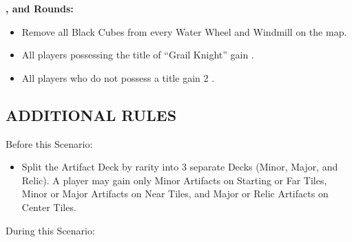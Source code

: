 \begin{multicols*}{2}
\textbf{,  and  Rounds:}
\begin{itemize}
  \item Remove all Black Cubes from every Water Wheel and Windmill on the map.
  \item All players possessing the title of ``\textcolor{cobalt}{Grail Knight}'' gain .
  \item All players who do not possess a title gain 2 .
\end{itemize}

\subsection*{\MakeUppercase{Additional Rules}}
Before this Scenario:

\begin{itemize}
  \item Split the Artifact Deck by rarity into 3 separate Decks (Minor, Major, and Relic). A player may gain only Minor Artifacts on Starting or Far Tiles, Minor or Major Artifacts on Near Tiles, and Major or Relic Artifacts on Center Tiles.
\end{itemize}

During this Scenario:


\end{multicols*}
